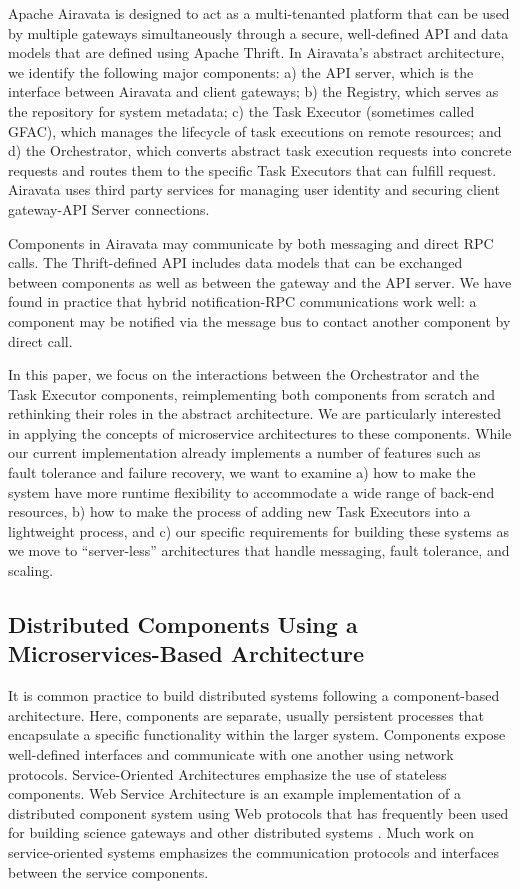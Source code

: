 \documentclass[review]{elsarticle}
\begin{document}
Apache Airavata is designed to act as a multi-tenanted platform that can be used by multiple gateways simultaneously through a secure, well-defined API and data models that are defined using Apache Thrift.   In Airavata's abstract architecture, we identify the following major components: a) the API server, which is the interface between Airavata and client gateways; b) the Registry, which serves as the repository for system metadata; c) the Task Executor (sometimes called GFAC), which manages the lifecycle of task executions on remote resources; and d) the Orchestrator, which converts abstract task execution requests into concrete requests and routes them to the specific Task Executors that can fulfill request.  Airavata uses third party services for managing user identity and securing client gateway-API Server connections.  

Components in Airavata may communicate by both messaging and direct RPC calls.  The Thrift-defined API includes data models that can be exchanged between components as well as between the gateway and the API server.  We have found in practice that hybrid notification-RPC communications work well: a component may be notified via the message bus to contact another component by direct call.

In this paper, we focus on the interactions between the Orchestrator and the Task Executor components, reimplementing both components from scratch and rethinking their roles in the abstract architecture. We are particularly interested in applying the concepts of microservice architectures to these components.  While our current implementation already implements a number of features such as fault tolerance and failure recovery, we want to examine a) how to make the system have more runtime flexibility to accommodate a wide range of back-end resources, b) how to make the process of adding new Task Executors into a lightweight process, and c) our specific requirements for building these systems as we move to ``server-less'' architectures that handle messaging, fault tolerance, and scaling.

\subsection{Distributed Components Using a Microservices-Based Architecture}
It is common practice to build distributed systems following a component-based architecture. Here, components are separate, usually persistent processes that encapsulate a specific functionality within the larger system. Components expose well-defined interfaces and communicate with one another using network protocols.  Service-Oriented Architectures emphasize the use of stateless components. Web Service Architecture is an example implementation of a distributed component system using Web protocols that has frequently been used for building science gateways and other distributed systems \cite{kacsuk2012ws}\cite{marzolla2007open}.   Much work on service-oriented systems emphasizes the communication protocols and interfaces between the service components. 
\end{document}
